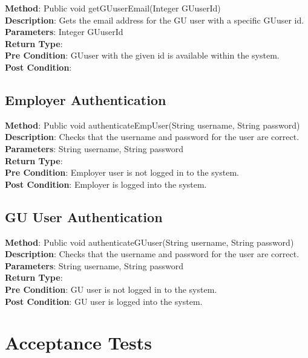 \documentclass{l3deliverable}
\begin{document}
\textbf{Method}: Public void getGUuserEmail(Integer GUuserId)\\
\textbf{Description}: Gets the email address for the GU user with a specific GUuser id.\\
\textbf{Parameters}: Integer GUuserId\\
\textbf{Return Type}:\\
\textbf{Pre Condition}: GUuser with the given id is available within the system.\\
\textbf{Post Condition}:\\

\subsection{Employer Authentication}

\textbf{Method}: Public void authenticateEmpUser(String username, String password)\\
\textbf{Description}: Checks that the username and password for the user are correct.\\
\textbf{Parameters}: String username, String password\\
\textbf{Return Type}:\\
\textbf{Pre Condition}: Employer user is not logged in to the system.\\
\textbf{Post Condition}: Employer is logged into the system.\\

\subsection{GU User Authentication}

\textbf{Method}: Public void authenticateGUuser(String username, String password)\\
\textbf{Description}: Checks that the username and password for the user are correct. \\
\textbf{Parameters}: String username, String password\\
\textbf{Return Type}:\\
\textbf{Pre Condition}: GU user is not logged in to the system.\\
\textbf{Post Condition}: GU user is logged into the system.\\


\section{Acceptance Tests}
\end{document}
